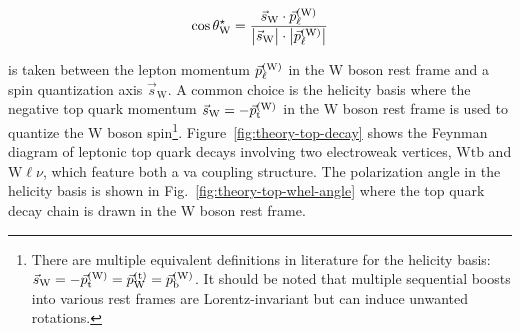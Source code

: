 \begin{equation}
\cos\theta^\star_\mathrm{W}=\frac{\vec{s}_\mathrm{W}\cdot\vec{p}_{\ell}^\scriptn{\mathrm{(W)}}}{\big|\vec{s}_\mathrm{W}\big|\cdot\big|\vec{p}_{\ell}^\scriptn{\mathrm{(W)}}\big|}
\end{equation}

is taken between the lepton momentum $\vec{p}_{\ell}^\scriptn{\mathrm{(W)}}$ in the W boson rest frame and a spin quantization axis $\vec{s}_\mathrm{W}$. A common choice is the helicity basis where the negative top quark momentum $\vec{s}_\mathrm{W}=-\vec{p}_\mathrm{t}^\scriptn{\mathrm{(W)}}$ in the $\mathrm{W}$ boson rest frame is used to quantize the W boson spin\footnote{There are multiple equivalent definitions in literature for the helicity basis: $\vec{s}_\mathrm{W}=-\vec{p}_\mathrm{t}^\scriptn{\mathrm{(W)}}=\vec{p}_\mathrm{W}^\scriptn{\mathrm{(t)}}=\vec{p}_\mathrm{b}^\scriptn{\mathrm{(W)}}$. It should be noted that multiple sequential boosts into various rest frames are Lorentz-invariant but can induce unwanted rotations.}. Figure~\ref{fig:theory-top-decay} shows the Feynman diagram of leptonic top quark decays involving two electroweak vertices, $\mathrm{Wtb}$ and $\mathrm{W}\ell\nu$, which feature both a \gls{va} coupling structure. The polarization angle in the helicity basis is shown in Fig.~\ref{fig:theory-top-whel-angle} where the top quark decay chain is drawn in the W boson rest frame.


